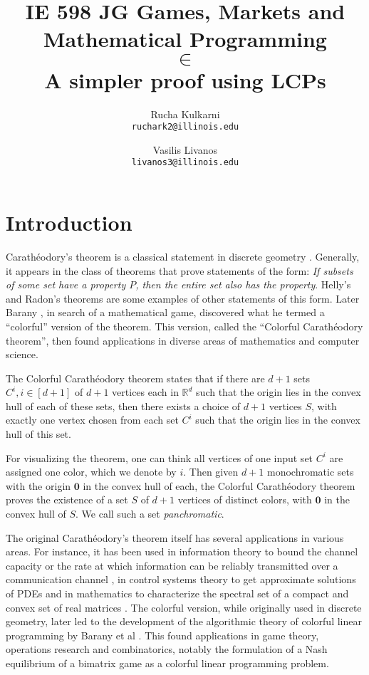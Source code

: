 \documentclass[a4paper,11pt]{article}
\title{IE 598 JG Games, Markets and Mathematical Programming \\ \CCP $\in$ \PPAD \\ A simpler proof using LCPs}
\author{
	{\sc Rucha Kulkarni} \\
	\texttt{ruchark2@illinois.edu}
	\and
	{\sc Vasilis Livanos} \\
	\texttt{livanos3@illinois.edu}
}
\date{}
\def\CC{Colorful Carath\'eodory }
\def\C{Carath\'eodory}
\def\org{\bm{0}}
\begin{document}
 \maketitle

\section{Introduction}

\par \C's theorem is a classical statement in discrete geometry \cite{CP07}. Generally, it appears in the class of theorems that prove statements of the form: \textit{If subsets of some set have a property $P$, then the entire set also has the property}. Helly's and Radon's theorems are some examples of other statements of this form. Later Barany \cite{IB}, in search of a mathematical game, discovered what he termed a ``colorful'' version of the theorem. This version, called the ``\CC theorem'', then found applications in diverse areas of mathematics and computer science. 

\par The \CC theorem states that if there are $d+1$ sets $C^i, i \in [d+1]$ of $d+1$ vertices each in $\mathbb{R}^d$ such that the origin lies in the convex hull of each of these sets, then there exists a choice of $d+1$ vertices $S$, with exactly one vertex chosen from each set $C^i$ such that the origin lies in the convex hull of this set.

\par For visualizing the theorem, one can think all vertices of one input set $C^i$ are assigned one color,
which we denote by $i$. Then given $d+1$ monochromatic sets with the origin $\org$ in the convex hull of each, the
\CC theorem proves the existence of a set $S$ of $d+1$ vertices of distinct colors, with $\org$ in the convex
hull of $S$. We call such a set \textit{panchromatic}.

\par The original \C's theorem itself has several applications in various areas. For instance, it has been used in information theory to bound the channel capacity or the rate at which information can be reliably transmitted over a communication channel \cite{CP_App1}, in control systems theory to get approximate solutions of PDEs \cite{CP_App3} and in mathematics to characterize the spectral set of a compact and convex set of real matrices \cite{CP_App2}. The colorful version, while originally used in discrete geometry, later led to the development of the algorithmic theory of colorful linear programming by Barany et al \cite{CCP_Apps}. This found applications in game theory, operations research and combinatorics, notably the formulation of a Nash equilibrium of a bimatrix game as a colorful linear programming problem. %
\end{document}
